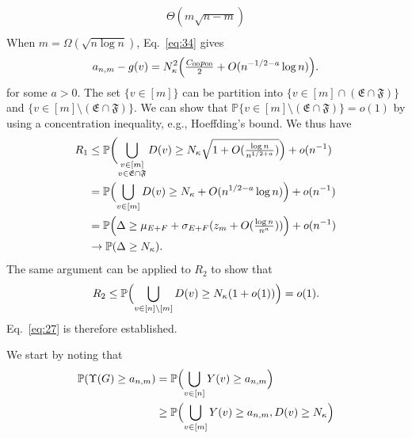 \documentclass[10pt,journal,compsoc]{IEEEtran}
\theoremstyle{definition}
\begin{document}
\begin{IEEEproof}[Lemma~8]
\begin{IEEEproof}[Eq.~\eqref{eq:27}]
\begin{equation}
\begin{split}
  \Theta(m \sqrt{n - m}) \\
  \end{split}
\end{equation}
When $m = \Omega(\sqrt{n \log n})$, Eq.~\eqref{eq:34} gives
\begin{equation}
  \label{eq:35}
  a_{n,m} - g(v) = N_{\kappa}^{2}\Bigl(\tfrac{C_{00}p_{00}}{2} + O(n^{-1/2 - a}
  \log{n})\Bigr).
\end{equation}
for some $a > 0$. The set $\{v \in [m]\}$ can be partition into
$\{v \in [m] \cap (\mathfrak{E} \cap\mathfrak{F})\}$ and $\{v \in [m]
\setminus (\mathfrak{E} \cap \mathfrak{F})\}$. We can show that
$\mathbb{P}\{v \in [m] \setminus (\mathfrak{E} \cap \mathfrak{F})\} =
o(1)$ by using a concentration inequality, e.g., Hoeffding's
bound. We thus have
\begin{equation}
  \label{eq:37}
  \begin{split}
    R_1 &\leq \mathbb{P}\biggl( \bigcup_{\substack{v \in [m] \\ v
        \in \mathfrak{E} \cap \mathfrak{F}}} D(v) \geq
    N_{\kappa} \sqrt{1 + O(\tfrac{\log{n}}{n^{1/2+a}})} \Bigr) + o(n^{-1}) \\
    & = \mathbb{P}\Bigl(\bigcup_{v \in [m]} D(v) \geq N_\kappa +
    O(n^{1/2 - a} \log{n})\Bigr) + o(n^{-1}) \\
    &= \mathbb{P}\Bigl(\Delta \geq \mu_{E+F} +
    \sigma_{E+F}(z_m + O(\tfrac{\log{n}}{n^{a}}))\Bigr) + o(n^{-1}) \\ 
    & \rightarrow \mathbb{P}(\Delta \geq N_{\kappa}).
    \end{split}
\end{equation}
The same argument can be applied to $R_2$ to show that
\begin{equation}
  \label{eq:38}
  R_2 \leq \mathbb{P}\Bigl(\bigcup_{v \in [n] \setminus [m]} D(v) \geq
  N_{\kappa}(1 + o(1))\Bigr) = o(1).
\end{equation}
Eq.~\eqref{eq:27} is therefore established.
\end{IEEEproof}
\begin{IEEEproof}[Eq.~\eqref{eq:30}]
  We start by noting that
  \begin{equation*}
    \begin{split}
      \mathbb{P}(\Upsilon(G) \geq a_{n,m}) &=
      \mathbb{P}\Bigl(\bigcup_{v \in [n]}Y(v) \geq
      a_{n,m}\Bigr) \\
      & \geq \mathbb{P}\Bigl(\bigcup_{v \in [m]}Y(v) \geq
      a_{n,m}, D(v) \geq N_\kappa \Bigr) \\

\end{split}
\end{equation*}
\end{IEEEproof}
\end{IEEEproof}
\end{document}
